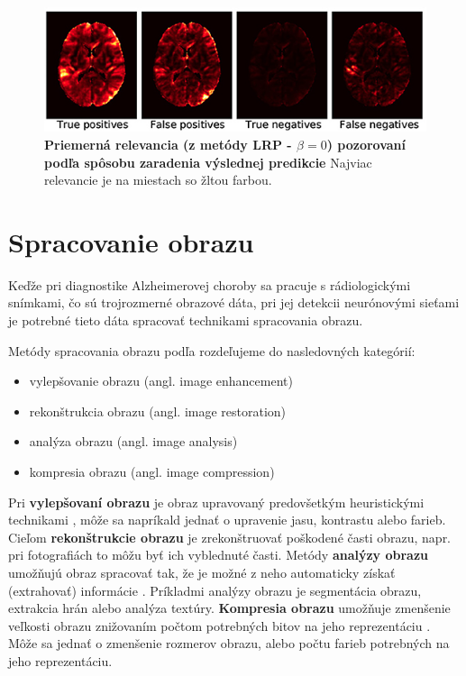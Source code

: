
\begin{figure}[h!]
    \centering
    \includegraphics[scale=0.4]{assets/images/lrp_alzheimer.png}
    \caption{
        \textbf{Priemerná relevancia (z metódy LRP - $\beta = 0$) pozorovaní podľa spôsobu zaradenia výslednej predikcie} Najviac relevancie je na miestach so žltou farbou. \cite{bohle2019layer}
    }
    \label{fig:lrp_alzheimer}
\end{figure}

\section{Spracovanie obrazu \label{cap:image_processing}}

Keďže pri diagnostike Alzheimerovej choroby sa pracuje s rádiologickými snímkami, čo sú trojrozmerné obrazové dáta, pri jej detekcii neurónovými sieťami je potrebné tieto dáta spracovať technikami spracovania obrazu.

Metódy spracovania obrazu podľa \citeauthor*{chen2004electrical} \cite{chen2004electrical} rozdeľujeme do nasledovných kategórií:
\begin{itemize}
    \item vylepšovanie obrazu (angl. image enhancement)
    \item rekonštrukcia obrazu (angl. image restoration)
    \item analýza obrazu (angl. image analysis)
    \item kompresia obrazu (angl. image compression)
\end{itemize}

Pri \textbf{vylepšovaní obrazu} je obraz upravovaný predovšetkým heuristickými technikami \cite{chen2004electrical}, môže sa napríkald jednať o upravenie jasu, kontrastu alebo farieb. Cieľom \textbf{rekonštrukcie obrazu} je zrekonštruovať poškodené časti obrazu, napr. pri fotografiách to môžu byť ich vyblednuté časti. Metódy \textbf{analýzy obrazu} umožňujú obraz spracovať tak, že je možné z neho automaticky získať (extrahovať) informácie \cite{chen2004electrical}. Príkladmi analýzy obrazu je segmentácia obrazu, extrakcia hrán alebo analýza textúry. \textbf{Kompresia obrazu} umožňuje zmenšenie veľkosti obrazu znižovaním počtom potrebných bitov na jeho reprezentáciu \cite{chen2004electrical}. Môže sa jednať o zmenšenie rozmerov obrazu, alebo počtu farieb potrebných na jeho reprezentáciu.

